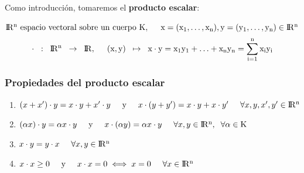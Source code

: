 \documentclass[10pt, a4paper]{article}
\theoremstyle{theorem-style}
\theoremstyle{definition-style}
\theoremstyle{remark-style}
\theoremstyle{example-style}
\theoremstyle{definition-style}
\theoremstyle{remark-style}
\begin{document}
Como introducción, tomaremos el \textbf{producto escalar}:

\hspace{1cm} $ \rm I\!R^n \text{ espacio vectoral sobre un cuerpo } K, \hspace{0.5cm} x=(x_1,\ldots,x_n), y=(y_1,\ldots,y_n) \in \rm I\!R^n$ \\
$$\cdot \hspace{2mm} : \hspace{2mm} \rm I\!R^n \hspace{2mm} \rightarrow \hspace{2mm} \rm I\!R, \hspace{0.5cm} (x,y) \hspace{2mm} \mapsto \hspace{2mm} x \cdot y = x_1y_1+\ldots+x_ny_n=\sum^n_{i=1}x_iy_i$$
\subsubsection*{Propiedades del producto escalar}

\begin{enumerate}
	\item $ (x+x')\cdot y=x \cdot y+x' \cdot y \text{\hspace{0.5cm}y\hspace{0.5cm}} x\cdot(y+y') = x \cdot y + x\cdot y' \hspace{0.5cm} \forall x, y, x', y' \in \rm I\!R^n$
	\item $ (\alpha x)\cdot y = \alpha x\cdot y \text{\hspace{0.5cm}y\hspace{0.5cm}} x\cdot(\alpha y) = \alpha x\cdot y \hspace{0.5cm} \forall x, y \in \rm I\!R ^n, \hspace{0.2cm} \forall \alpha \in K $
	\item $ x\cdot y = y\cdot x \hspace{0.5cm} \forall x, y \in \rm I\!R ^n $
	\item $ x\cdot x \geq 0 \text{\hspace{0.5cm}y\hspace{0.5cm}} x\cdot x = 0 \iff x=0 \hspace{0.5cm} \forall x \in \rm I\!R ^n$
\end{enumerate}

\end{document}
